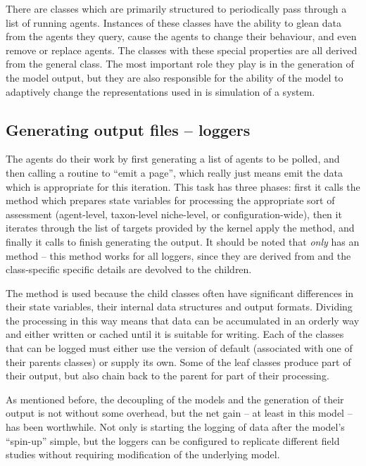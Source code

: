 There are classes which are primarily structured to periodically pass
through a list of running agents.  Instances of these classes have the
ability to glean data from the agents they query, cause the agents to
change their behaviour, and even remove or replace agents.  The
classes with these special properties are all derived from the
general  class.  The most important role they
play is in the generation of the model output, but they are also
responsible for the ability of the model to adaptively change the
representations used in is simulation of a system.


\subsection{Generating output files -- loggers}

The  agents do their work by first generating a list of
agents to be polled, and then calling a routine to ``emit a page'',
which really just means emit the data which is appropriate for this
iteration.  This task has three phases: first it calls the
method  which prepares state variables for
processing the appropriate sort of assessment (agent-level,
taxon-level niche-level, or configuration-wide), then it iterates
through the list of targets provided by the kernel apply
the  method, and finally it
calls  to finish generating the output.  It
should be noted that \emph{only\/}  has
an  method -- this method works for all loggers,
since they are derived from  and the class-specific
specific details are devolved to the children.

The method is used because the child classes often
have significant differences in their state variables, their internal
data structures and output formats.  Dividing the processing in this
way means that data can be accumulated in an orderly way and either
written or cached until it is suitable for writing.  Each of the
classes that can be logged must either use the
 version of
default  (associated with one of their parents
classes) or supply its own.  Some of the leaf classes produce part of
their output, but also chain back to the parent  for
part of their processing.

As mentioned before, the decoupling of the models and the generation
of their output is not without some overhead, but the net gain -- at
least in this model -- has been worthwhile. Not only is starting the
logging of data after the model's ``spin-up'' simple, but the loggers
can be configured to replicate different field studies without
requiring modification of the underlying model.

